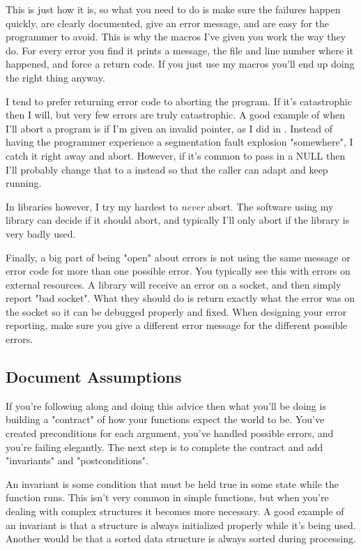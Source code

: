 This is just how it is, so what you need to do is make sure the failures happen quickly, are clearly documented,
give an error message, and are easy for the programmer to avoid.  This is why the  macros I've
given you work the way they do.  For every error you find it prints a message, the file and line number where
it happened, and force a return code.  If you just use my macros you'll end up doing the right thing anyway.

I tend to prefer returning error code to aborting the program.  If it's catastrophic then I will, but very
few errors are truly catastrophic.  A good example of when I'll abort a program is if I'm given an invalid
pointer, as I did in .  Instead of having the programmer experience a segmentation fault
explosion "somewhere", I catch it right away and abort.  However, if it's common to pass in a NULL then I'll
probably change that to a  instead so that the caller can adapt and keep running.

In libraries however, I try my hardest to \emph{never} abort.  The software using my library can decide if
it should abort, and typically I'll only abort if the library is very badly used.

Finally, a big part of being "open" about errors is not using the same message or error code for more than
one possible error.  You typically see this with errors on external resources.  A library will receive an error
on a socket, and then simply report "bad socket".  What they should do is return exactly what the error was
on the socket so it can be debugged properly and fixed.  When designing your error reporting, make sure you 
give a different error message for the different possible errors.

\subsection{Document Assumptions}

If you're following along and doing this advice then what you'll be doing is building a "contract" of
how your functions expect the world to be.  You've created preconditions for each argument, you've handled
possible errors, and you're failing elegantly.  The next step is to complete the contract and add "invariants"
and "postconditions".

An invariant is some condition that must be held true in some state while the function runs.  This isn't very common in
simple functions, but when you're dealing with complex structures it becomes more necessary.  A good example of an
invariant is that a structure is always initialized properly while it's being used.  Another would be that a sorted
data structure is always sorted during processing.

